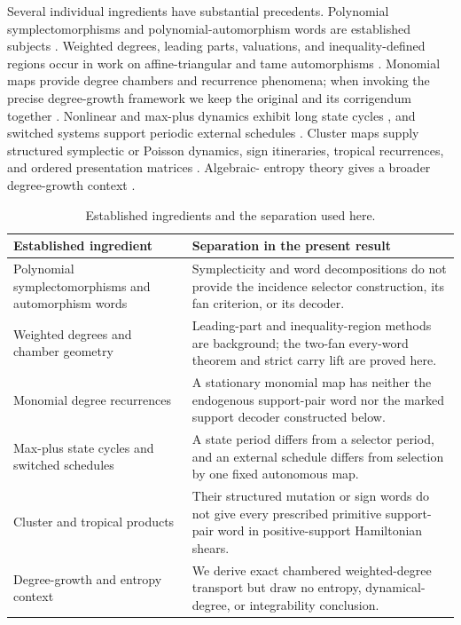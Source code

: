 \documentclass[11pt,letterpaper]{article}
\theoremstyle{definition}
\theoremstyle{remark}
\numberwithin{equation}{section}
\begin{document}
Several individual ingredients have substantial precedents.  Polynomial
symplectomorphisms and polynomial-automorphism words are established
subjects \citep{JaneczkoJelonek2008,FriedlandMilnor1989}.  Weighted degrees,
leading parts, valuations, and inequality-defined regions occur in work on
affine-triangular and tame automorphisms
\citep{BlancVanSanten2022,MeunierPreliminary,ShaoSun2025}.  Monomial maps
provide degree chambers and recurrence phenomena; when invoking the precise
degree-growth framework we keep the original and its corrigendum together
\citep{HasselblattPropp2007,HasselblattProppCorrigendum2007,BedfordKim2008}.
Nonlinear and max-plus dynamics exhibit long state cycles
\citep{Gunawardena2003,AkianGaubertLemmensNussbaum2006,OhmoriYamazaki2024},
and switched systems support periodic external schedules
\citep{ZorzenonKomendaRaisch2024}.  Cluster maps supply structured
symplectic or Poisson dynamics, sign itineraries, tropical recurrences, and
ordered presentation matrices
\citep{FordyHone2011,FordyHone2014,IshibashiKano2021,Kim2026}.  Algebraic-
entropy theory gives a broader degree-growth context
\citep{BellonViallet1999,HoneRagniscoZullo2016}.

\begin{table}[t]
\centering
\caption{Established ingredients and the separation used here.}
\label{tab:neighbors}
\begin{tabularx}{\textwidth}{@{}p{}X@{}}
\toprule
Established ingredient & Separation in the present result \\
\midrule
Polynomial symplectomorphisms and automorphism words
\citep{JaneczkoJelonek2008,FriedlandMilnor1989}
& Symplecticity and word decompositions do not provide the incidence
selector construction, its fan criterion, or its decoder. \\
Weighted degrees and chamber geometry
\citep{BlancVanSanten2022,MeunierPreliminary,ShaoSun2025}
& Leading-part and inequality-region methods are background; the two-fan
every-word theorem and strict carry lift are proved here. \\
Monomial degree recurrences
\citep{HasselblattPropp2007,HasselblattProppCorrigendum2007,BedfordKim2008}
& A stationary monomial map has neither the endogenous support-pair word nor
the marked support decoder constructed below. \\
Max-plus state cycles and switched schedules
\citep{Gunawardena2003,AkianGaubertLemmensNussbaum2006,OhmoriYamazaki2024,ZorzenonKomendaRaisch2024}
& A state period differs from a selector period, and an external schedule
differs from selection by one fixed autonomous map. \\
Cluster and tropical products
\citep{FordyHone2011,FordyHone2014,IshibashiKano2021,Kim2026}
& Their structured mutation or sign words do not give every prescribed
primitive support-pair word in positive-support Hamiltonian shears. \\
Degree-growth and entropy context
\citep{BellonViallet1999,HoneRagniscoZullo2016}
& We derive exact chambered weighted-degree transport but draw no entropy,
dynamical-degree, or integrability conclusion. \\
\bottomrule
\end{tabularx}
\end{table}
\end{document}
